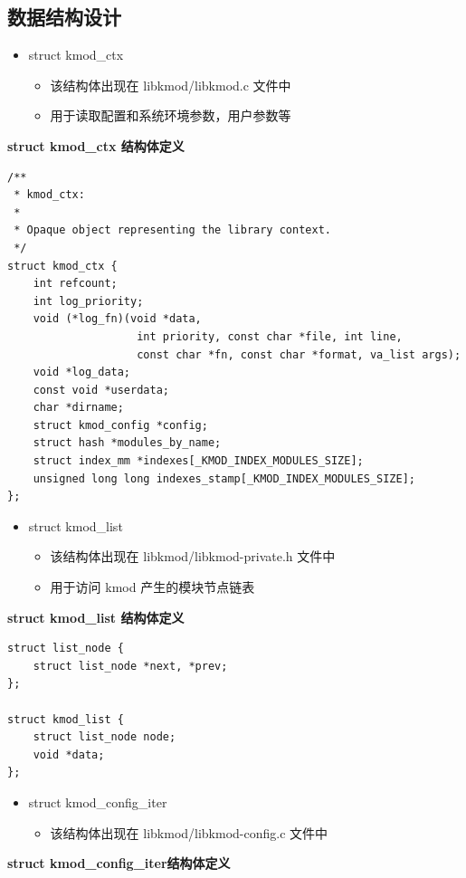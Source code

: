 \subsection{数据结构设计}

\begin{itemize}
\item
  struct kmod\_ctx
  \begin{itemize}
  \item
    该结构体出现在 libkmod/libkmod.c 文件中
  \item
    用于读取配置和系统环境参数，用户参数等
  \end{itemize}
\end{itemize}
\textbf{struct kmod\_ctx 结构体定义}

{\begin{shaded}\begin{verbatim}
/**
 * kmod_ctx:
 *
 * Opaque object representing the library context.
 */
struct kmod_ctx {
    int refcount;
    int log_priority;
    void (*log_fn)(void *data,
                    int priority, const char *file, int line,
                    const char *fn, const char *format, va_list args);
    void *log_data;
    const void *userdata;
    char *dirname;
    struct kmod_config *config;
    struct hash *modules_by_name;
    struct index_mm *indexes[_KMOD_INDEX_MODULES_SIZE];
    unsigned long long indexes_stamp[_KMOD_INDEX_MODULES_SIZE];
};
\end{verbatim}\end{shaded}}
\begin{itemize}
\item
  struct kmod\_list
  \begin{itemize}
  \item
    该结构体出现在 libkmod/libkmod-private.h 文件中
  \item
    用于访问 kmod 产生的模块节点链表
  \end{itemize}
\end{itemize}
\textbf{struct kmod\_list 结构体定义}

{\begin{shaded}\begin{verbatim}
struct list_node {
    struct list_node *next, *prev;
};

struct kmod_list {
    struct list_node node;
    void *data;
};
\end{verbatim}\end{shaded}}
\begin{itemize}
\item
  struct kmod\_config\_iter
  \begin{itemize}
  \item
    该结构体出现在 libkmod/libkmod-config.c 文件中
  \end{itemize}
\end{itemize}
\textbf{struct kmod\_config\_iter结构体定义}

